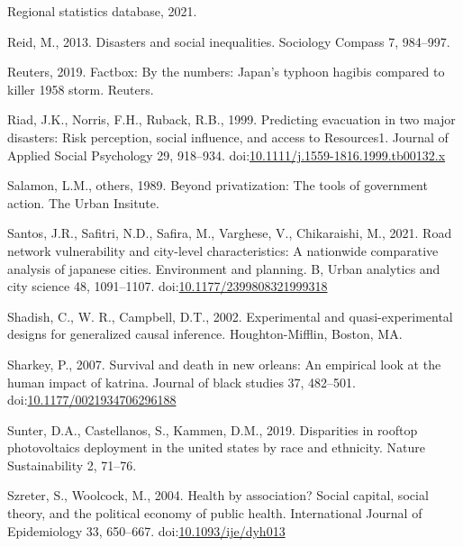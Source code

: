 \documentclass[]{elsarticle} %
\newlength{\cslhangindent}
\newlength{\cslentryspacingunit} %
\newenvironment{CSLReferences}[2] %
 {%
  \setlength{\parindent}{0pt}
  \ifodd #1
  \let\oldpar\par
  \def\par{\hangindent=\cslhangindent\oldpar}
  \fi
  \setlength{\parskip}{#2\cslentryspacingunit}
 }%
 {}
\begin{document}
\begin{CSLReferences}{1}{0}
\leavevmode{}%
Regional statistics database, 2021.

\leavevmode{}%
Reid, M., 2013. Disasters and social inequalities. Sociology Compass 7,
984--997.

\leavevmode{}%
Reuters, 2019. Factbox: By the numbers: Japan's typhoon hagibis compared
to killer 1958 storm. Reuters.

\leavevmode{}%
Riad, J.K., Norris, F.H., Ruback, R.B., 1999. Predicting evacuation in
two major disasters: Risk perception, social influence, and access to
Resources1. Journal of Applied Social Psychology 29, 918--934.
doi:\href{https://doi.org/10.1111/j.1559-1816.1999.tb00132.x}{10.1111/j.1559-1816.1999.tb00132.x}

\leavevmode{}%
Salamon, L.M., others, 1989. Beyond privatization: The tools of
government action. The Urban Insitute.

\leavevmode{}%
Santos, J.R., Safitri, N.D., Safira, M., Varghese, V., Chikaraishi, M.,
2021. Road network vulnerability and city-level characteristics: A
nationwide comparative analysis of japanese cities. Environment and
planning. B, Urban analytics and city science 48, 1091--1107.
doi:\href{https://doi.org/10.1177/2399808321999318}{10.1177/2399808321999318}

\leavevmode{}%
Shadish, C., W. R., Campbell, D.T., 2002. Experimental and
quasi-experimental designs for generalized causal inference.
Houghton-Mifflin, Boston, MA.

\leavevmode{}%
Sharkey, P., 2007. Survival and death in new orleans: An empirical look
at the human impact of katrina. Journal of black studies 37, 482--501.
doi:\href{https://doi.org/10.1177/0021934706296188}{10.1177/0021934706296188}

\leavevmode{}%
Sunter, D.A., Castellanos, S., Kammen, D.M., 2019. Disparities in
rooftop photovoltaics deployment in the united states by race and
ethnicity. Nature Sustainability 2, 71--76.

\leavevmode{}%
Szreter, S., Woolcock, M., 2004. {Health by association? Social capital,
social theory, and the political economy of public health}.
International Journal of Epidemiology 33, 650--667.
doi:\href{https://doi.org/10.1093/ije/dyh013}{10.1093/ije/dyh013}


\end{CSLReferences}
\end{document}
